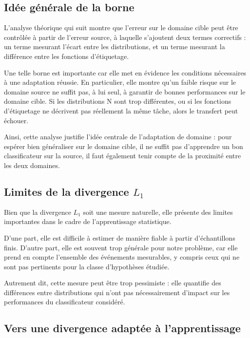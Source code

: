 \documentclass[a4paper,12pt]{article}
\theoremstyle{definition}
\theoremstyle{remark}
\begin{document}
\subsection{Idée générale de la borne}

L’analyse théorique qui suit montre que l’erreur sur le domaine cible peut être contrôlée à partir de l’erreur source, à laquelle s’ajoutent deux termes correctifs : un terme mesurant l’écart entre les distributions, et un terme mesurant la différence entre les fonctions d’étiquetage.

Une telle borne est importante car elle met en évidence les conditions nécessaires à une adaptation réussie. En particulier, elle montre qu’un faible risque sur le domaine source ne suffit pas, à lui seul, à garantir de bonnes performances sur le domaine cible. Si les distributions N sont trop différentes, ou si les fonctions d’étiquetage ne décrivent pas réellement la même tâche, alors le transfert peut échouer.

Ainsi, cette analyse justifie l’idée centrale de l’adaptation de domaine : pour espérer bien généraliser sur le domaine cible, il ne suffit pas d’apprendre un bon classificateur sur la source, il faut également tenir compte de la proximité entre les deux domaines.

\subsection{Limites de la divergence \texorpdfstring{$L_1$}{L1}}

Bien que la divergence $L_1$ soit une mesure naturelle, elle présente des limites importantes dans le cadre de l’apprentissage statistique.

D’une part, elle est difficile à estimer de manière fiable à partir d’échantillons finis. D’autre part, elle est souvent trop générale pour notre problème, car elle prend en compte l’ensemble des événements mesurables, y compris ceux qui ne sont pas pertinents pour la classe d’hypothèses étudiée.

Autrement dit, cette mesure peut être trop pessimiste : elle quantifie des différences entre distributions qui n’ont pas nécessairement d’impact sur les performances du classificateur considéré.

\subsection{Vers une divergence adaptée à l’apprentissage}
\end{document}
